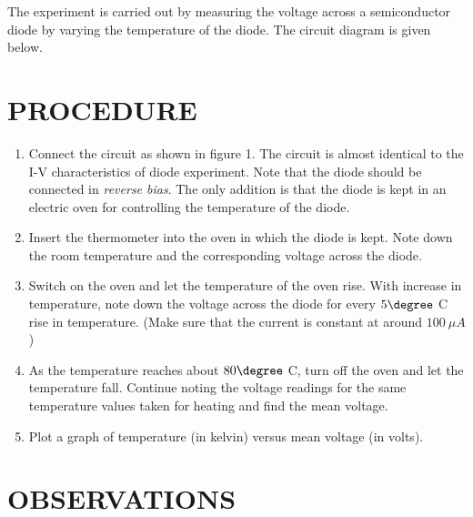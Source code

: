 \documentclass[12pt,a4paper]{article}
\begin{document}
		The experiment is carried out by measuring the voltage across a semiconductor diode by varying the temperature of the diode. The circuit diagram is given below.
		
	\section{\textcolor{b1}{PROCEDURE}}
		
		\begin{enumerate}
			
			\begin{figure}[!htb]
				\centering
				\texttt{[image: Eg-circuit.pdf]}
				\caption{Circuit Diagram}
			\end{figure}
			
			\item Connect the circuit as shown in figure 1. The circuit is almost identical to the I-V characteristics of diode experiment. Note that the diode should be connected in \textit{reverse bias}. The only addition is that the diode is kept in an electric oven for controlling the temperature of the diode.
			
			\item Insert the thermometer into the oven in which the diode is kept. Note down the room temperature and the corresponding voltage across the diode.
			
			\item Switch on the oven and let the temperature of the oven rise. With increase in temperature, note down the voltage across the diode for every $5\degree$ C rise in temperature. (Make sure that the current is constant at around $100\ \mu A$)
			
			\item As the temperature reaches about $80\degree$ C, turn off the oven and let the temperature fall. Continue noting the voltage readings for the same temperature values taken for heating and find the mean voltage.
			
			\item  Plot a graph of temperature (in kelvin) versus mean voltage (in volts).
			
		\end{enumerate}
	
	\section{\textcolor{b1}{OBSERVATIONS}}
		
\end{document}
